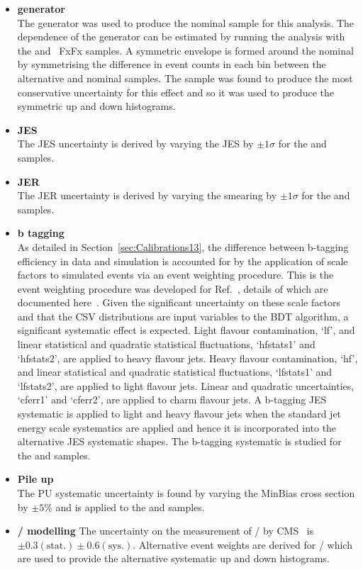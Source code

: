 \begin{itemize}
\item \textbf{\ttbar generator}\\
The \POWHEG generator was used to produce the nominal \ttbar sample for this analysis. The dependence of the generator can be estimated by running the analysis with the \MLM and \MADGRAPH\aMCATNLO~FxFx \ttbar samples. A symmetric envelope is formed around the nominal by symmetrising the difference in event counts in each bin between the alternative and nominal samples. The \MLM sample was found to produce the most conservative uncertainty for this effect and so it was used to produce the symmetric up and down histograms.
\item \textbf{JES}\\
The JES uncertainty is derived by varying the JES by $\pm1\sigma$ for the \ttbar and \tttt samples.
\item \textbf{JER}\\
The JER uncertainty is derived by varying the smearing by $\pm1\sigma$ for the \ttbar and \tttt samples.
\item \textbf{b tagging}\\
As detailed in Section~\ref{sec:Calibrations13}, the difference between b-tagging efficiency in data and simulation is accounted for by the application of scale factors to simulated events via an event weighting procedure. This is the event weighting procedure was developed for Ref.~\cite{CMS-PAS-HIG-16-004}, details of which are documented here~\cite{CMS-NOTE-2013-130}. Given the significant uncertainty on these scale factors and that the CSV distributions are input variables to the BDT algorithm, a significant systematic effect is expected. Light flavour contamination, `lf', and linear statistical and quadratic statistical fluctuations, `hfstats1' and `hfstats2', are applied to heavy flavour jets. Heavy flavour contamination, `hf', and linear statistical and quadratic statistical fluctuations, `lfstats1' and `lfstats2', are applied to light flavour jets. Linear and quadratic uncertainties, `cferr1' and `cferr2', are applied to charm flavour jets. A b-tagging JES systematic is applied to light and heavy flavour jets when the standard jet energy scale systematics are applied and hence it is incorporated into the alternative JES systematic shapes. The b-tagging systematic is studied for the \ttbar and \tttt samples.
\item \textbf{Pile up}\\
The PU systematic uncertainty is found by varying the MinBias cross section by $\pm5\%$ and is applied to the \ttbar and \tttt samples.
\item \textbf{\heavyflavourone / \heavyflavourtwo modelling}
The uncertainty on the measurement of \heavyflavourone / \heavyflavourtwo by CMS~\cite{Khachatryan2015132} is $\pm 0.3 \left( \textrm{stat.} \right) \pm 0.6 \left(\textrm{sys.} \right)$. Alternative event weights are derived for \heavyflavourone / \heavyflavourtwo which are used to provide the alternative systematic up and down histograms.
\end{itemize}

